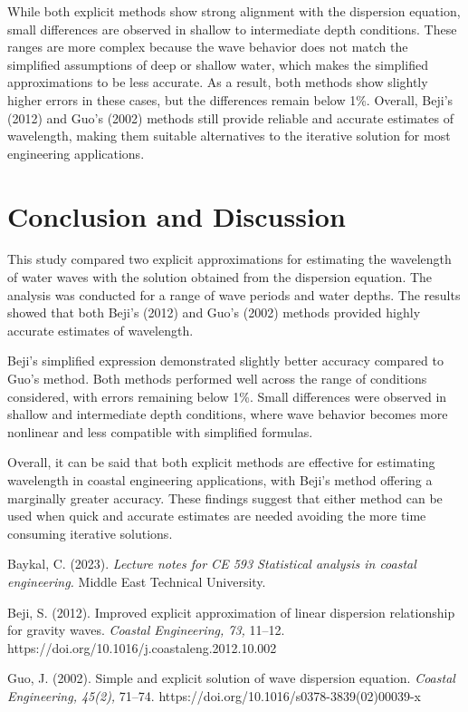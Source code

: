 \documentclass[a4paper, 11pt]{article}
\begin{document}
While both explicit methods show strong alignment with the dispersion equation, small differences are observed in shallow to intermediate depth conditions. These ranges are more complex because the wave behavior does not match the simplified assumptions of deep or shallow water, which makes the simplified approximations to be less accurate. As a result, both methods show slightly higher errors in these cases, but the differences remain below 1\%. Overall, Beji’s (2012) and Guo’s (2002) methods still provide reliable and accurate estimates of wavelength, making them suitable alternatives to the iterative solution for most engineering applications.

\section{Conclusion and Discussion}

\hspace{0.5cm}This study compared two explicit approximations for estimating the wavelength of water waves with the solution obtained from the dispersion equation. The analysis was conducted for a range of wave periods and water depths. The results showed that both Beji's (2012) and Guo's (2002) methods provided highly accurate estimates of wavelength. 

Beji's simplified expression demonstrated slightly better accuracy compared to Guo's method. Both methods performed well across the range of conditions considered, with errors remaining below 1\%. Small differences were observed in shallow and intermediate depth conditions, where wave behavior becomes more nonlinear and less compatible with simplified formulas.

Overall, it can be said that both explicit methods are effective for estimating wavelength in coastal engineering applications, with Beji's method offering a marginally greater accuracy. These findings suggest that either method can be used when quick and accurate estimates are needed avoiding the more time consuming iterative solutions.
\newpage

\begin{thebibliography}{99}

Baykal, C. (2023). \textit{Lecture notes for CE 593 Statistical analysis in coastal engineering.} Middle East Technical University.

 Beji, S. (2012). Improved explicit approximation of linear dispersion relationship for gravity waves. \textit{Coastal Engineering, 73,} 11–12. https://doi.org/10.1016/j.coastaleng.2012.10.002

 Guo, J. (2002). Simple and explicit solution of wave dispersion equation. \textit{Coastal Engineering, 45(2),} 71–74. https://doi.org/10.1016/s0378-3839(02)00039-x


\end{thebibliography}
\newpage
\end{document}
